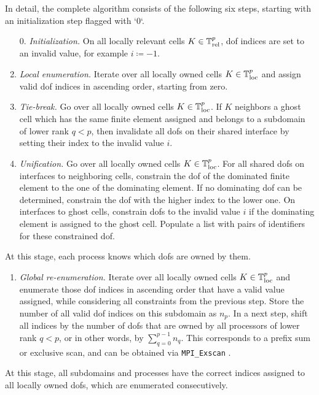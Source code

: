 In detail, the complete algorithm consists of the following six steps, starting with an initialization step flagged with `0`.
\begin{enumerate}
  \item[0.] \textit{Initialization.}
  On all locally relevant cells $K \in \mathbb{T}^p_{\text{rel}}$, \gls{dof} indices are set to an invalid value, for example $i \coloneqq -1$.
  \item \textit{Local enumeration.}
  Iterate over all locally owned cells $K \in \mathbb{T}^p_{\text{loc}}$ and assign valid \gls{dof} indices in ascending order, starting from zero.
  \item \textit{Tie-break.}
  Go over all locally owned cells $K \in \mathbb{T}^p_{\text{loc}}$. If $K$ neighbors a ghost cell which has the same finite element assigned and belongs to a subdomain of lower rank $q < p$, then invalidate all \glspl{dof} on their shared interface by setting their index to the invalid value $i$.
  \item \textit{Unification.}
  Go over all locally owned cells $K \in \mathbb{T}^p_{\text{loc}}$. For all shared \glspl{dof} on interfaces to neighboring cells, constrain the \gls{dof} of the dominated finite element to the one of the dominating element. If no dominating \gls{dof} can be determined, constrain the \gls{dof} with the higher index to the lower one. On interfaces to ghost cells, constrain \glspl{dof} to the invalid value $i$ if the dominating element is assigned to the ghost cell.
  Populate a list with pairs of identifiers for these constrained \gls{dof}.
\end{enumerate}
At this stage, each process knows which \glspl{dof} are owned by them.
\begin{enumerate}[resume]
  \item \textit{Global re-enumeration.}
  Iterate over all locally owned cells $K \in \mathbb{T}^p_{\text{loc}}$
  and enumerate those \gls{dof} indices in ascending order that have a valid value assigned, while considering all constraints from the previous step. Store the number of all valid \gls{dof} indices on this subdomain as $n_p$. In a next step, shift all indices by the number of \glspl{dof} that are owned by all processors of lower rank $q < p$, or in other words, by $\sum_{q=0}^{p-1} n_q$. This corresponds to a prefix sum or exclusive scan, and can be obtained via \texttt{MPI\_Exscan} \textcite{mpi31}.
\end{enumerate}
At this stage, all subdomains and processes have the correct indices assigned to all locally owned \glspl{dof}, which are enumerated consecutively.
